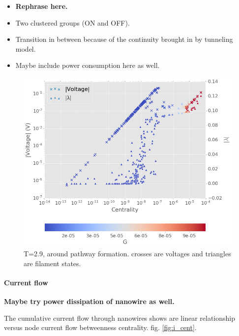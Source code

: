 \documentclass[%
 reprint,
 amsmath,amssymb,
 aps,
]{revtex4-2}
\begin{document}
\begin{itemize}
\item \textbf{Rephrase here.}
\item Two clustered groups (ON and OFF). 
\item Transition in between because of the continuity brought in by tunneling model.
\item Maybe include power consumption here as well.
\end{itemize}

\begin{figure}[h]
	\centering
	\includegraphics[width=1\linewidth]{figure/v_lam_cent}
	\caption{T=2.9, around pathway formation. crosses are voltages and triangles are filament states.}
	\label{fig:v_lam_cent}
\end{figure}

\paragraph{Current flow}

\textbf{Maybe try power dissipation of nanowire as well.}

The cumulative current flow through nanowires shows are linear relationship versus node current flow betweenness centrality. fig. \ref{fig:i_cent}.
\end{document}
